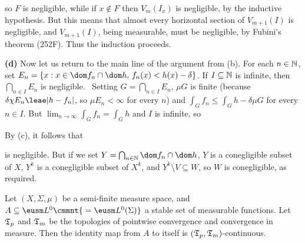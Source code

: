 {

\noindent so $F$ is negligible, while if $x\notin F$ then $V_m(I_x)$ is
negligible, by the inductive hypothesis.   But this means that almost
every horizontal section of $V_{m+1}(I)$ is negligible, and
$V_{m+1}(I)$, being measurable, must be negligible, by Fubini's theorem
(252F).   Thus the induction proceeds.\ \Qed

\medskip

{\bf (d)} Now let us return to the main line of the argument from (b).
For each $n\in\Bbb N$, set $E_n=\{x:x\in\dom f_n\cap\dom
h,\,f_n(x)<h(x)-\delta\}$.   If $I\subseteq\Bbb N$ is infinite, then
$\bigcap_{n\in I}E_n$ is negligible.   \Prf\ Setting
$G=\bigcap_{n\in I}E_n$, $\mu G$ is finite (because
$\delta\chi E_n\leae|h-f_n|$, so
$\mu E_n<\infty$ for every $n$) and $\int_Gf_n\le\int_Gh-\delta\mu G$
for every $n\in I$.   But $\lim_{n\to\infty}\int_Gf_n=\int_Gh$
and $I$ is infinite, so


By (c), it follows that


\noindent is negligible.   But if we set
$Y=\bigcap_{n\in\Bbb N}\dom f_n\cap\dom h$, $Y$ is a conegligible subset
of $X$, $Y^k$ is a conegligible subset of $X^k$, and
$Y^k\setminus V\subseteq W$, so $W$ is conegligible, as required.
}%

 Let $(X,\Sigma,\mu)$ be a semi-finite measure
space, and $A\subseteq\eusm L^0\cmmnt{\mskip5mu =\eusm L^0(\Sigma)}$ a
stable
set of measurable functions.   Let $\frak T_p$ and $\frak T_m$ be the
topologies of pointwise convergence and convergence in
measure.   Then the identity map from $A$ to
itself is $(\frak T_p,\frak T_m)$-continuous.

